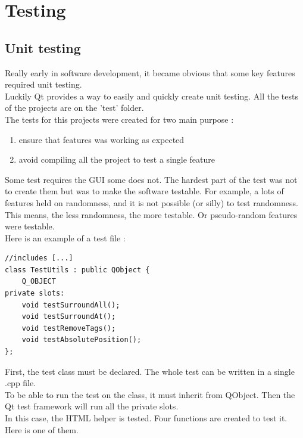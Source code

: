 \part{Testing}
\chapter{Unit testing}
Really early in software development, it became obvious that some key features required unit testing.\\
Luckily Qt provides a way to easily and quickly create unit testing. All the tests of the projects are on the 'test' folder.\\
The tests for this projects were created for two main purpose :
\begin{enumerate}
	\item ensure that features was working as expected
	\item avoid compiling all the project to test a single feature
\end{enumerate}
Some test requires the GUI some does not. The hardest part of the test was not to create them but was to make the software testable. For example, a lots of features held on randomness, and it is not possible (or silly) to test randomness. This means, the less randomness, the more testable. Or pseudo-random features were testable.\\
Here is an example of a test file :

\begin{lstlisting}
//includes [...]
class TestUtils : public QObject {
    Q_OBJECT
private slots:
    void testSurroundAll();
    void testSurroundAt();
    void testRemoveTags();
    void testAbsolutePosition();
};
\end{lstlisting}
First, the test class must be declared. The whole test can be written in a single .cpp file.\\
To be able to run the test on the class, it must inherit from QObject. Then the Qt test framework will run all the
private slots.\\
In this case, the HTML helper is tested. Four functions are created to test it.\\
Here is one of them.

